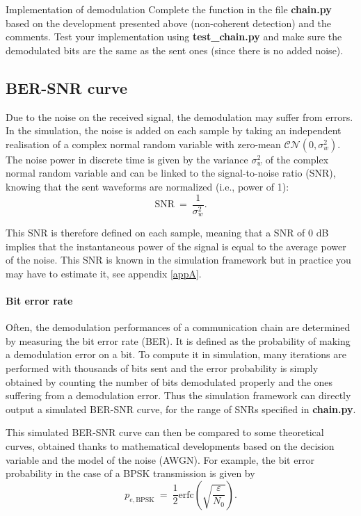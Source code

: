 \begin{bclogo}[couleur = gray!20, arrondi = 0.2, logo=\bccrayon]{Implementation of demodulation}
Complete the  function in the file \textbf{chain.py} based on the development presented above (non-coherent detection) and the comments. Test your implementation using \textbf{test_chain.py} and make sure the demodulated bits are the same as the sent ones (since there is no added noise).
\end{bclogo}

\subsection{BER-SNR curve}
Due to the noise on the received signal, the demodulation may suffer from errors. In the simulation, the noise is added on each sample by taking an independent realisation of a complex normal random variable with zero-mean $\mathcal{CN}(0,\sigma_w^2)$. The noise power in discrete time is given by the variance $\sigma_w^2$ of the complex normal random variable and can be linked to the signal-to-noise ratio (SNR), knowing that the sent waveforms are normalized (i.e., power of 1):
\begin{equation*}
    \text{SNR}\:=\:\frac{1}{\sigma_w^2}.
\end{equation*}

This SNR is therefore defined on each sample, meaning that a SNR of 0 dB implies that the instantaneous power of the signal is equal to the average power of the noise. This SNR is known in the simulation framework but in practice you may have to estimate it, see appendix \ref{appA}.




\paragraph{Bit error rate}
Often, the demodulation performances of a communication chain are determined by measuring the bit error rate (BER). It is defined as the probability of making a demodulation error on a bit. To compute it in simulation, many iterations are performed with thousands of bits sent and the error probability is simply obtained by counting the number of bits demodulated properly and the ones suffering from a demodulation error. Thus the simulation framework can directly output a simulated BER-SNR curve, for the range of SNRs specified in \textbf{chain.py}.

This simulated BER-SNR curve can then be compared to some theoretical curves, obtained thanks to mathematical developments based on the decision variable and the model of the noise (AWGN). For example, the bit error probability in the case of a BPSK transmission is given by
\begin{equation*}
    p_{e,\text{BPSK}}\:=\:\frac{1}{2} \text{erfc}\left(\sqrt{\frac{\varepsilon}{N_0}}\right).
\end{equation*}

